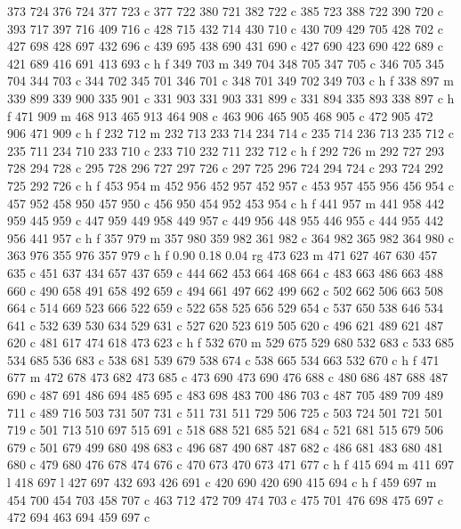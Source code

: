 {{   373 724 376 724 377 723 c
   377 722 380 721 382 722 c
   385 723 388 722 390 720 c
   393 717 397 716 409 716 c
   428 715 432 714 430 710 c
   430 709 429 705 428 702 c
   427 698 428 697 432 696 c
   439 695 438 690 431 690 c
   427 690 423 690 422 689 c
   421 689 416 691 413 693 c
   h f
   349 703 m
   349 704 348 705 347 705 c
   346 705 345 704 344 703 c
   344 702 345 701 346 701 c
   348 701 349 702 349 703 c
   h f
   338 897 m
   339 899 339 900 335 901 c
   331 903 331 903 331 899 c
   331 894 335 893 338 897 c
   h f
   471 909 m
   468 913 465 913 464 908 c
   463 906 465 905 468 905 c
   472 905 472 906 471 909 c
   h f
   232 712 m
   232 713 233 714 234 714 c
   235 714 236 713 235 712 c
   235 711 234 710 233 710 c
   233 710 232 711 232 712 c
   h f
   292 726 m
   292 727 293 728 294 728 c
   295 728 296 727 297 726 c
   297 725 296 724 294 724 c
   293 724 292 725 292 726 c
   h f
   453 954 m
   452 956 452 957 452 957 c
   453 957 455 956 456 954 c
   457 952 458 950 457 950 c
   456 950 454 952 453 954 c
   h f
   441 957 m
   441 958 442 959 445 959 c
   447 959 449 958 449 957 c
   449 956 448 955 446 955 c
   444 955 442 956 441 957 c
   h f
   357 979 m
   357 980 359 982 361 982 c
   364 982 365 982 364 980 c
   363 976 355 976 357 979 c
   h f
   0.90 0.18 0.04 rg
   473 623 m
   471 627 467 630 457 635 c
   451 637 434 657 437 659 c
   444 662 453 664 468 664 c
   483 663 486 663 488 660 c
   490 658 491 658 492 659 c
   494 661 497 662 499 662 c
   502 662 506 663 508 664 c
   514 669 523 666 522 659 c
   522 658 525 656 529 654 c
   537 650 538 646 534 641 c
   532 639 530 634 529 631 c
   527 620 523 619 505 620 c
   496 621 489 621 487 620 c
   481 617 474 618 473 623 c
   h f
   532 670 m
   529 675 529 680 532 683 c
   533 685 534 685 536 683 c
   538 681 539 679 538 674 c
   538 665 534 663 532 670 c
   h f
   471 677 m
   472 678 473 682 473 685 c
   473 690 473 690 476 688 c
   480 686 487 688 487 690 c
   487 691 486 694 485 695 c
   483 698 483 700 486 703 c
   487 705 489 709 489 711 c
   489 716 503 731 507 731 c
   511 731 511 729 506 725 c
   503 724 501 721 501 719 c
   501 713 510 697 515 691 c
   518 688 521 685 521 684 c
   521 681 515 679 506 679 c
   501 679 499 680 498 683 c
   496 687 490 687 487 682 c
   486 681 483 680 481 680 c
   479 680 476 678 474 676 c
   470 673 470 673 471 677 c
   h f
   415 694 m
   411 697 l
   418 697 l
   427 697 432 693 426 691 c
   420 690 420 690 415 694 c
   h f
   459 697 m
   454 700 454 703 458 707 c
   463 712 472 709 474 703 c
   475 701 476 698 475 697 c
   472 694 463 694 459 697 c
}}
